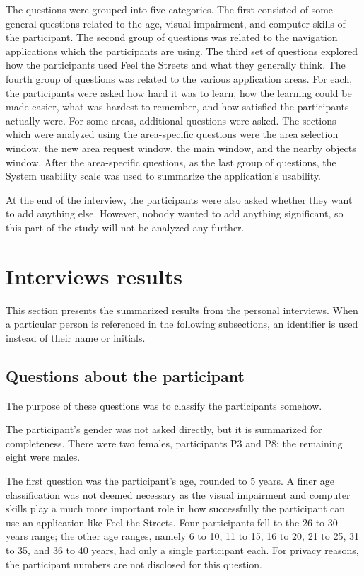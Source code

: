 \documentclass[nolof,digital]{fithesis3}
\begin{document}
The questions were grouped into five categories. The first consisted of some general questions related to the age, visual impairment, and computer skills of the participant. The second group of questions was related to the navigation applications which the participants are using. The third set of questions explored how the participants used Feel the Streets and what they generally think. The fourth group of questions was related to the various application areas. For each, the participants were asked how hard it was to learn, how the learning could be made easier, what was hardest to remember, and how satisfied the participants actually were. For some areas, additional questions were asked. The sections which were analyzed using the area-specific questions were the area selection window, the new area request window, the main window, and the nearby objects window. After the area-specific questions, as the last group of questions, the System usability scale \parencite{brooke1996} was used to summarize the application's usability.

At the end of the interview, the participants were also asked whether they want to add anything else. However, nobody wanted to add anything significant, so this part of the study will not be analyzed any further.
\section{Interviews results}
This section presents the summarized results from the personal interviews. When a particular person is referenced in the following subsections, an identifier is used instead of their name or initials.
\subsection{Questions about the participant}
The purpose of these questions was to classify the participants somehow.

The participant's gender was not asked directly, but it is summarized for completeness. There were two females, participants P3 and P8; the remaining eight were males.

The first question was the participant's age, rounded to 5 years. A finer age classification was not deemed necessary as the visual impairment and computer skills play a much more important role in how successfully the participant can use an application like Feel the Streets. Four participants fell to the 26 to 30 years range; the other age ranges, namely 6 to 10, 11 to 15, 16 to 20, 21 to 25, 31 to 35, and 36 to 40 years, had only a single participant each. For privacy reasons, the participant numbers are not disclosed for this question.
\end{document}
